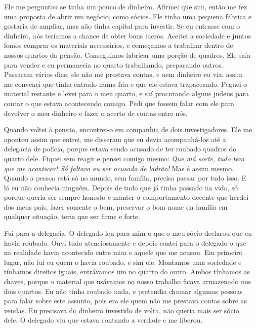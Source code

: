 Ele me perguntou se tinha um pouco de dinheiro. Afirmei que sim,
então me fez uma proposta de abrir um negócio, como sócios. Ele tinha uma
pequena fábrica e gostaria de ampliar, mas não tinha capital para
investir. Se eu entrasse com o dinheiro, nós teríamos a chance de obter
bons lucros. Aceitei a sociedade e juntos fomos comprar os materiais
necessários, e começamos a trabalhar dentro de nossos quartos da pensão.
Conseguimos fabricar uma porção de quadros. Ele saía para vender e eu
permanecia no quarto trabalhando, preparando outros. Passaram vários
dias, ele não me prestava contas, e nem dinheiro eu via, assim me
convenci que tinha entrado numa fria e que ele estava trapaceando. Peguei
o material restante e levei para o meu quarto, e saí procurando alguns
judeus para contar o que estava acontecendo comigo. Pedi que
fossem falar com ele para devolver o meu dinheiro e fazer o acerto de
contas entre nós.

Quando voltei à pensão, encontrei-o em companhia de dois investigadores. 
Ele me apontou assim que entrei, me disseram que eu devia
acompanhá-los até a delegacia de polícia, porque estava sendo acusado de
ter roubado quadros do quarto dele. Fiquei sem reagir e pensei comigo
mesmo: \textit{Que má sorte, tudo tem que me acontecer! Só faltava eu ser
acusado de ladrão!} Mas é assim mesmo. Quando a pessoa está só no
mundo, sem família, precisa passar por tudo isso. E lá eu não conhecia
ninguém. Depois de tudo que já tinha passado na vida, só porque queria
ser sempre honesto e manter o comportamento decente que herdei dos meus
pais, fazer somente o bem, preservar o bom nome da família em
qualquer situação, teria que ser firme e forte.

Fui para a delegacia. O delegado leu para mim o que o meu sócio
declarou que eu havia roubado. Ouvi tudo atenciosamente e depois contei
para o delegado o que na realidade havia acontecido entre mim e aquele
que me acusou. Em primeiro lugar, não fui eu quem o havia
roubado, e sim ele. Montamos uma sociedade e tínhamos direitos iguais, 
entrávamos um no quarto do outro. Ambos tínhamos
as chaves, porque o material que usávamos no nosso trabalho
ficava armazenado nos dois quartos. Eu não tinha roubado nada, e pretendia
chamar algumas pessoas para falar sobre este assunto, pois era ele quem não
me prestava contas sobre as vendas. Eu precisava do dinheiro investido de volta, não queria
mais ser sócio dele. O delegado viu que estava contando a verdade e me
liberou.

